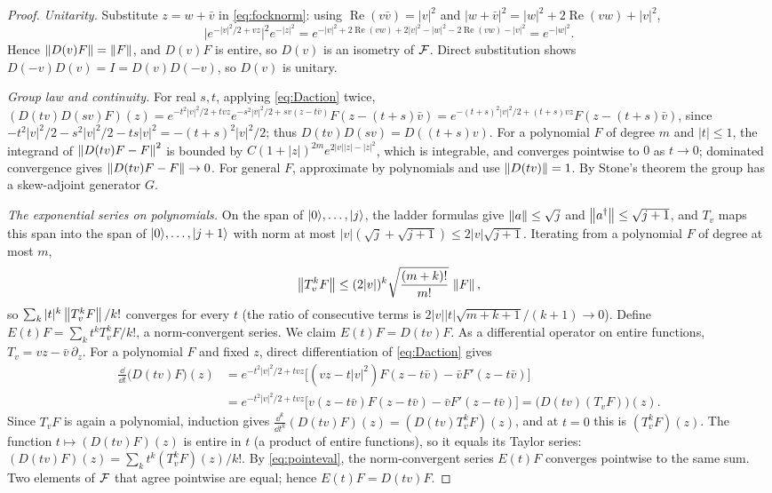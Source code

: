 \begin{proof}
\emph{Unitarity.} Substitute $z=w+\bar v$ in \eqref{eq:focknorm}: using
$\operatorname{Re}(v\bar v)=|v|^2$ and
$|w+\bar v|^2=|w|^2+2\operatorname{Re}(vw)+|v|^2$,
\[
 \bigl|e^{-|v|^2/2+vz}\bigr|^2e^{-|z|^2}
 =e^{-|v|^2+2\operatorname{Re}(vw)+2|v|^2-|w|^2-2\operatorname{Re}(vw)-|v|^2}
 =e^{-|w|^2}.
\]
Hence
$\left\lVert D(v)F\right\rVert=\left\lVert F\right\rVert$, and $D(v)F$ is entire, so $D(v)$ is an isometry of
$\mathcal{F}$. Direct substitution shows $D(-v)D(v)=I=D(v)D(-v)$, so $D(v)$ is
unitary.

\emph{Group law and continuity.} For real $s,t$, applying
\eqref{eq:Daction} twice,
$(D(tv)D(sv)F)(z)=e^{-t^2|v|^2/2+tvz}e^{-s^2|v|^2/2+sv(z-t\bar v)}F(z-(t+s)\bar v)
=e^{-(t+s)^2|v|^2/2+(t+s)vz}F(z-(t+s)\bar v)$, since
$-t^2|v|^2/2-s^2|v|^2/2-ts|v|^2=-(t+s)^2|v|^2/2$; thus $D(tv)D(sv)=D((t+s)v)$.
For a polynomial $F$ of degree $m$ and $|t|\leq1$, the integrand of
$\left\lVert D(tv)F-F\right\rVert^2$ is bounded by $C(1+|z|)^{2m}e^{2|v||z|-|z|^2}$, which is
integrable, and converges pointwise to $0$ as $t\to0$; dominated convergence
gives $\left\lVert D(tv)F-F\right\rVert\to0$. For general $F$, approximate by polynomials and
use $\left\lVert D(tv)\right\rVert=1$. By Stone's theorem the group has a skew-adjoint
generator $G$.

\emph{The exponential series on polynomials.} On the span of
$\lvert0\rangle,\ldots,\lvert j\rangle$, the ladder formulas give $\left\lVert a\right\rVert\leq\sqrt j$ and
$\left\lVert a^\dagger\right\rVert\leq\sqrt{j+1}$, and $T_v$ maps this span into the span of
$\lvert0\rangle,\ldots,\lvert j+1\rangle$ with norm at most $|v|(\sqrt j+\sqrt{j+1})\leq2|v|\sqrt{j+1}$.
Iterating from a polynomial $F$ of degree at most $m$,
\begin{equation}\label{eq:analyticvectors}
 \left\lVert T_v^kF\right\rVert\leq(2|v|)^k\sqrt{\frac{(m+k)!}{m!}}\,\left\lVert F\right\rVert,
\end{equation}
so $\sum_k|t|^k\left\lVert T_v^kF\right\rVert/k!$ converges for every $t$ (the ratio of
consecutive terms is $2|v||t|\sqrt{m+k+1}/(k+1)\to0$). Define
$E(t)F=\sum_kt^kT_v^kF/k!$, a norm-convergent series. We claim
$E(t)F=D(tv)F$. As a differential operator on entire functions,
$T_v=vz-\bar v\,\partial_z$. For a polynomial $F$ and fixed $z$, direct
differentiation of \eqref{eq:Daction} gives
\begin{align*}
 \frac{\dd}{\dd t}\bigl(D(tv)F\bigr)(z)
 &=e^{-t^2|v|^2/2+tvz}\bigl[(vz-t|v|^2)F(z-t\bar v)-\bar vF'(z-t\bar v)\bigr]\\
 &=e^{-t^2|v|^2/2+tvz}\bigl[v(z-t\bar v)F(z-t\bar v)-\bar vF'(z-t\bar v)\bigr]
 =\bigl(D(tv)(T_vF)\bigr)(z).
\end{align*}
Since $T_vF$ is again a polynomial, induction gives
$\frac{\dd^k}{\dd t^k}(D(tv)F)(z)=(D(tv)T_v^kF)(z)$, and at $t=0$ this is
$(T_v^kF)(z)$. The function $t\mapsto(D(tv)F)(z)$ is entire in $t$ (a
product of entire functions), so it equals its Taylor series:
$(D(tv)F)(z)=\sum_kt^k(T_v^kF)(z)/k!$. By \eqref{eq:pointeval}, the
norm-convergent series $E(t)F$ converges pointwise to the same sum. Two
elements of $\mathcal{F}$ that agree pointwise are equal; hence $E(t)F=D(tv)F$.


\end{proof}
